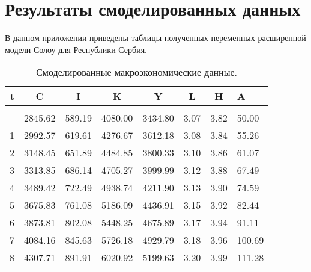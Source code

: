 \chapter{Результаты смоделированных данных}
\label{cha:second_app}

В данном приложении приведены таблицы полученных переменных расширенной модели Солоу для Республики Сербия.

\begin{center}
	\begin{longtable}{|r|c|c|c|c|c|c|l|}
		\caption{Смоделированные макроэкономические данные.}
		\label{tab::data_results}\\
		\hline
		t & C & I & K & Y & L & H & A\\ \hline
		\endfirsthead
		\subcaption{Продолжение таблицы~\ref{tab::data_results}}
		\\ \hline \endhead
		\hline \subcaption{Продолжение на след. стр.}
		\endfoot
		\hline \endlastfoot
		0 & 2845.62 & 589.19 & 4080.00 & 3434.80 & 3.07 & 3.82 & 50.00 \\
		1 & 2992.57 & 619.61 & 4276.67 & 3612.18 & 3.08 & 3.84 & 55.26 \\
		2 & 3148.45 & 651.89 & 4484.85 & 3800.33 & 3.10 & 3.86 & 61.07 \\
		3 & 3313.85 & 686.14 & 4705.27 & 3999.99 & 3.12 & 3.88 & 67.49 \\
		4 & 3489.42 & 722.49 & 4938.74 & 4211.90 & 3.13 & 3.90 & 74.59 \\
		5 & 3675.83 & 761.08 & 5186.09 & 4436.91 & 3.15 & 3.92 & 82.44 \\
		6 & 3873.81 & 802.08 & 5448.25 & 4675.89 & 3.17 & 3.94 & 91.11 \\
		7 & 4084.16 & 845.63 & 5726.18 & 4929.79 & 3.18 & 3.96 & 100.69 \\
		8 & 4307.71 & 891.91 & 6020.92 & 5199.63 & 3.20 & 3.99 & 111.28 \\ \hline
		\end{longtable}
	\end{center}
